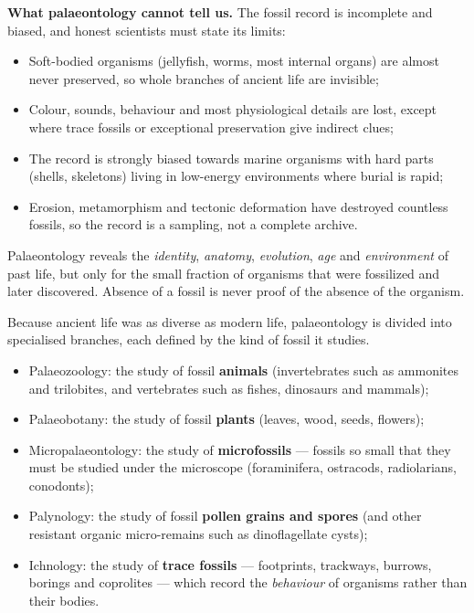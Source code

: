\documentclass[11pt]{article}
\newcommand{\cle}[1]{{\popxbold\color{popdark}#1}}
\newcounter{popsec}
\newcounter{popsub}
\newcommand{\courssub}[1]{%
  \stepcounter{popsub}%
  \par\vspace{9pt}\noindent{\popxbold\fontsize{11.5}{13}\selectfont\color{popink}{\color{poporange}\thepopsec.\thepopsub}\hspace{6pt}#1}\par\nopagebreak\vspace{4pt}
}
\begin{document}
\textbf{What palaeontology cannot tell us.} The fossil record is incomplete and biased, and honest scientists must state its limits:

\begin{itemize}
\item Soft-bodied organisms (jellyfish, worms, most internal organs) are almost never preserved, so whole branches of ancient life are invisible;
\item Colour, sounds, behaviour and most physiological details are lost, except where trace fossils or exceptional preservation give indirect clues;
\item The record is strongly biased towards marine organisms with hard parts (shells, skeletons) living in low-energy environments where burial is rapid;
\item Erosion, metamorphism and tectonic deformation have destroyed countless fossils, so the record is a sampling, not a complete archive.
\end{itemize}

\begin{aretenir}
Palaeontology reveals the \emph{identity}, \emph{anatomy}, \emph{evolution}, \emph{age} and \emph{environment} of past life, but only for the small fraction of organisms that were fossilized and later discovered. Absence of a fossil is never proof of the absence of the organism.
\end{aretenir}

\courssub{The Branches of Palaeontology}

Because ancient life was as diverse as modern life, palaeontology is divided into specialised branches, each defined by the kind of fossil it studies.

\begin{definition}
\begin{itemize}
\item \cle{Palaeozoology}: the study of fossil \textbf{animals} (invertebrates such as ammonites and trilobites, and vertebrates such as fishes, dinosaurs and mammals);
\item \cle{Palaeobotany}: the study of fossil \textbf{plants} (leaves, wood, seeds, flowers);
\item \cle{Micropalaeontology}: the study of \textbf{microfossils} --- fossils so small that they must be studied under the microscope (foraminifera, ostracods, radiolarians, conodonts);
\item \cle{Palynology}: the study of fossil \textbf{pollen grains and spores} (and other resistant organic micro-remains such as dinoflagellate cysts);
\item \cle{Ichnology}: the study of \textbf{trace fossils} --- footprints, trackways, burrows, borings and coprolites --- which record the \emph{behaviour} of organisms rather than their bodies.
\end{itemize}
\end{definition}
\end{document}
